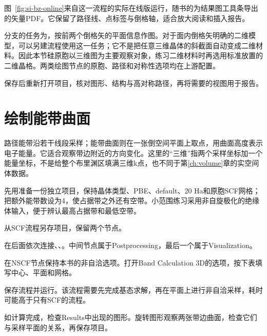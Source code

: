 

图~\ref{fig:si-bz-online}来自这一流程的实际在线版运行，随书的为结果图工具条导出的矢量PDF。它保留了路径线、点标签与倒格轴，适合放大阅读和插入报告。

分支的任务为，按前两个倒格矢的平面信息作图。对于面内倒格矢明确的二维模型，可以另建流程使用这一任务；它不是把任意三维晶体的斜截面自动变成二维材料。因此本节硅原胞以三维图为主要观察对象，练习二维材料时再选用标准放置的二维晶格。两类绘图节点的原胞、路径和对称性选项均在上游配置。

保存后重新打开项目，核对图形、结构与高对称路径，再将需要的视图用于报告。


\section{绘制能带曲面}\label{sec:band-surface}

路径能带沿若干线段采样；能带曲面则在一张倒空间平面上取点，用曲面高度表示电子能量。它适合观察带边附近的方向变化。这里的“三维”指两个采样坐标加一个能量坐标，不是给整个布里渊区填满三维k点，也不同于第\ref{ch:volume}章的实空间体数据。

先用准备一份独立项目，保持晶体类型、PBE、default、20 Ha和原胞SCF网格；把额外能带数设为4，使占据带之外还有空带。小范围练习采用非自旋极化的绝缘体输入，便于辨认最高占据带和最低空带。

\begin{steps}
\item 从SCF流程另存项目，保留两个节点。
\item 在后面依次连接、、。中间节点属于Postprocessing，最后一个属于Visualization。
\item 在NSCF节点保持本书的非自洽选项。打开Band Calculation 3D的选项，按下表填写中心、平面和网格。
\item 保存流程并运行。该流程需要先完成基态求解，再在平面上进行非自洽采样，耗时可能高于只有SCF的流程。
\item 如计算完成，检查Results中出现的图形。旋转图形观察两张带边曲面，检查它们与采样平面的关系，再保存项目。
\end{steps}

